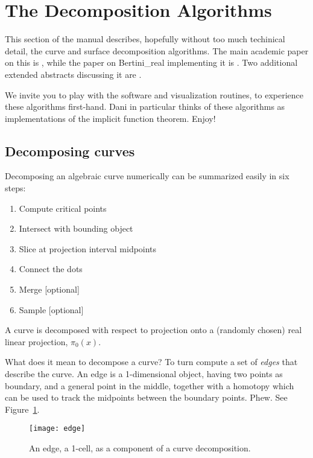\section{The Decomposition Algorithms}
\label{sec:algo}

This section of the manual describes, hopefully without too much techinical detail, the curve and surface decomposition algorithms.  The main academic paper on this is \cite{besana2013cell}, while the paper on Bertini\_real implementing it is \cite{BrN15}.  Two additional extended abstracts discussing it are \cite{Brake2014, On14}.

We invite you to play with the software and visualization routines, to experience these algorithms first-hand.  Dani in particular thinks of these algorithms as implementations of the implicit function theorem.  Enjoy!


\subsection{Decomposing curves}
\label{sec:algo_curve}



Decomposing an algebraic curve numerically can be summarized easily in six steps:
%
\begin{enumerate}
\item Compute critical points
\item Intersect with bounding object
\item Slice at projection interval midpoints
\item Connect the dots
\item Merge [optional]
\item Sample [optional]
\end{enumerate}

A curve is decomposed with respect to projection onto a (randomly chosen) real linear projection, $\pi_0(x)$.


What does it mean to decompose a curve?  To turn compute a set of {\em edges} that describe the curve.  An edge is a 1-dimensional object, having two points as boundary, and a general point in the middle, together with a homotopy which can be used to track the midpoints between the boundary points.  Phew.  See Figure~\ref{fig:edge}.




\begin{figure}[H]
\begin{center}
\texttt{[image: edge]}
\caption{An edge, a 1-cell, as a component of a curve decomposition.}
\label{fig:edge}
\end{center}
\end{figure}


